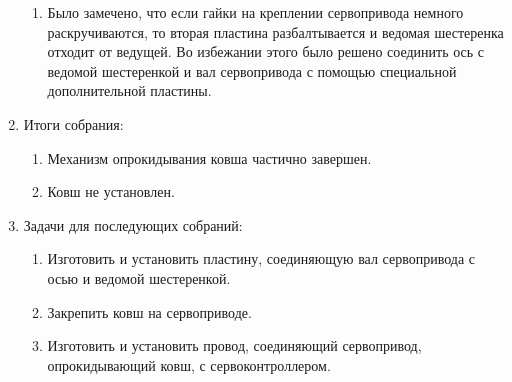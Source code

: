 \begin{enumerate}
\begin{enumerate}
      \item Было замечено, что если гайки на креплении сервопривода немного раскручиваются, то вторая пластина разбалтывается и ведомая шестеренка отходит от ведущей. Во избежании этого было решено соединить ось с ведомой шестеренкой и вал сервопривода с помощью специальной дополнительной пластины.
      
 	\end{enumerate}
 	\item Итоги собрания:
 	\begin{enumerate}
 		
 	  \item Механизм опрокидывания ковша частично завершен.
 		
 	  \item Ковш не установлен. 
 		
 	\end{enumerate}
 	\item Задачи для последующих собраний:
 	\begin{enumerate}
 		
 	  \item Изготовить и установить пластину, соединяющую вал сервопривода с осью и ведомой шестеренкой.
 		
 	  \item Закрепить ковш на сервоприводе.
 		
 	  \item Изготовить и установить провод, соединяющий сервопривод, опрокидывающий ковш, с сервоконтроллером.
 				
 	\end{enumerate}
\end{enumerate}
\fillpage